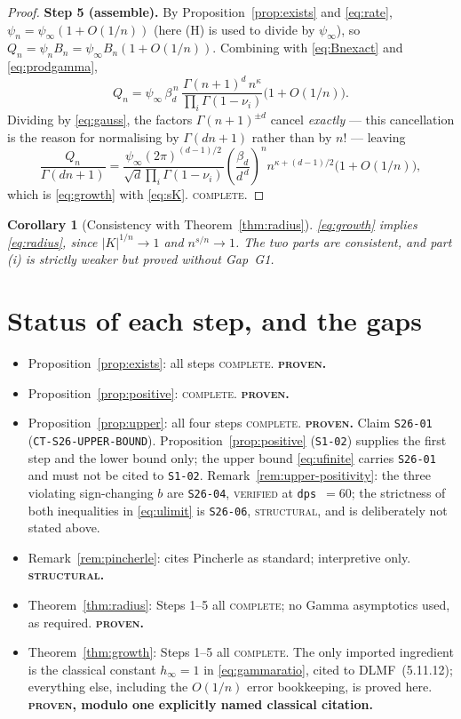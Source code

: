 \documentclass[11pt]{article}
\newtheorem{corollary}[theorem]{Corollary}
\theoremstyle{definition}
\newcommand{\bd}{\beta_d}
\newcommand{\psiinf}{\psi_\infty}
\begin{document}
\begin{proof}
\medskip\noindent\textbf{Step 5 (assemble).}
By Proposition~\ref{prop:exists} and \eqref{eq:rate}, $\psi_n=\psiinf(1+O(1/n))$
(here (H) is used to divide by $\psiinf$), so $Q_n=\psi_nB_n=\psiinf B_n(1+O(1/n))$.
Combining with \eqref{eq:Bnexact} and \eqref{eq:prodgamma},
\[
Q_n=\psiinf\,\bd^{\,n}\,
\frac{\Gamma(n+1)^{d}\,n^{\kappa}}{\prod_i\Gamma(1-\nu_i)}\bigl(1+O(1/n)\bigr).
\]
Dividing by \eqref{eq:gauss}, the factors $\Gamma(n+1)^{\pm d}$ cancel
\emph{exactly} --- this cancellation is the reason for normalising by
$\Gamma(dn+1)$ rather than by $n!$ --- leaving
\[
\frac{Q_n}{\Gamma(dn+1)}
=\frac{\psiinf(2\pi)^{(d-1)/2}}{\sqrt d\prod_i\Gamma(1-\nu_i)}
\left(\frac{\bd}{d^{\,d}}\right)^{\!n}
n^{\kappa+(d-1)/2}\bigl(1+O(1/n)\bigr),
\]
which is \eqref{eq:growth} with \eqref{eq:sK}. \textsc{complete.}
\end{proof}

\begin{corollary}[Consistency with Theorem~\ref{thm:radius}]
\eqref{eq:growth} implies \eqref{eq:radius}, since $|K|^{1/n}\to1$ and
$n^{s/n}\to1$. The two parts are consistent, and part (i) is strictly weaker but
proved without Gap~G1.
\end{corollary}

\section{Status of each step, and the gaps}\label{sec:gaps}

\begin{itemize}
\item Proposition~\ref{prop:exists}: all steps \textsc{complete}.
\textbf{\textsc{proven}.}
\item Proposition~\ref{prop:positive}: \textsc{complete}. \textbf{\textsc{proven}.}
\item Proposition~\ref{prop:upper}: all four steps \textsc{complete}.
\textbf{\textsc{proven}.} Claim \texttt{S26-01}
(\texttt{CT-S26-UPPER-BOUND}). Proposition~\ref{prop:positive}
(\texttt{S1-02}) supplies the first step and the lower bound only; the upper
bound \eqref{eq:ufinite} carries \texttt{S26-01} and must not be cited to
\texttt{S1-02}. Remark~\ref{rem:upper-positivity}: the three violating
sign-changing $b$ are \texttt{S26-04}, \textsc{verified} at
\texttt{dps}~$=60$; the strictness of both inequalities in \eqref{eq:ulimit} is
\texttt{S26-06}, \textsc{structural}, and is deliberately not stated above.
\item Remark~\ref{rem:pincherle}: cites Pincherle as standard; interpretive only.
\textbf{\textsc{structural}.}
\item Theorem~\ref{thm:radius}: Steps 1--5 all \textsc{complete}; no Gamma
asymptotics used, as required. \textbf{\textsc{proven}.}
\item Theorem~\ref{thm:growth}: Steps 1--5 all \textsc{complete}. The only
imported ingredient is the classical constant $h_\infty=1$ in
\eqref{eq:gammaratio}, cited to DLMF~(5.11.12); everything else, including the
$O(1/n)$ error bookkeeping, is proved here. \textbf{\textsc{proven}, modulo one
explicitly named classical citation.}
\end{itemize}
\end{document}
